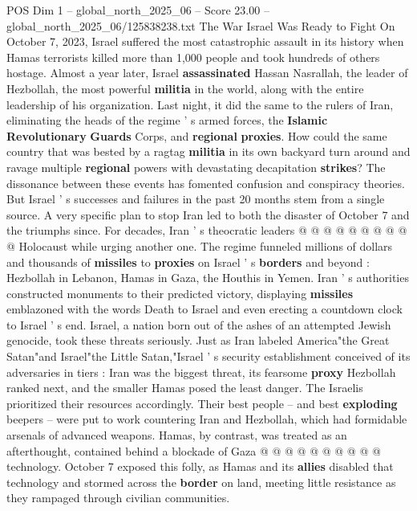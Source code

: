 \begin{textsample}{POS Dim 1 – global\_north\_2025\_06 – Score 23.00 – global\_north\_2025\_06/125838238.txt}  \label{ex:f1_pos_335}
The War Israel Was Ready to Fight On October 7, 2023, Israel suffered the most catastrophic assault in its history when Hamas terrorists killed more than 1,000 people and took hundreds of others hostage.
Almost a year later, Israel \textbf{assassinated} Hassan Nasrallah, the leader of Hezbollah, the most powerful \textbf{militia} in the world, along with the entire leadership of his organization.
Last night, it did the same to the rulers of Iran, eliminating the heads of the regime ' s armed forces, the \textbf{Islamic} \textbf{Revolutionary} \textbf{Guards} Corps, and \textbf{regional} \textbf{proxies}.
How could the same country that was bested by a ragtag \textbf{militia} in its own backyard turn around and ravage multiple \textbf{regional} powers with devastating decapitation \textbf{strikes}?
The dissonance between these events has fomented confusion and conspiracy theories.
But Israel ' s successes and failures in the past 20 months stem from a single source.
A very specific plan to stop Iran led to both the disaster of October 7 and the triumphs since.
For decades, Iran ' s theocratic leaders @ @ @ @ @ @ @ @ @ @ Holocaust while urging another one.
The regime funneled millions of dollars and thousands of \textbf{missiles} to \textbf{proxies} on Israel ' s \textbf{borders} and beyond : Hezbollah in Lebanon, Hamas in Gaza, the Houthis in Yemen.
Iran ' s authorities constructed monuments to their predicted victory, displaying \textbf{missiles} emblazoned with the words Death to Israel and even erecting a countdown clock to Israel ' s end.
Israel, a nation born out of the ashes of an attempted Jewish genocide, took these threats seriously.
Just as Iran labeled America"the Great Satan"and Israel"the Little Satan,"Israel ' s security establishment conceived of its adversaries in tiers : Iran was the biggest threat, its fearsome \textbf{proxy} Hezbollah ranked next, and the smaller Hamas posed the least danger.
The Israelis prioritized their resources accordingly.
Their best people -- and best \textbf{exploding} beepers -- were put to work countering Iran and Hezbollah, which had formidable arsenals of advanced weapons.
Hamas, by contrast, was treated as an afterthought, contained behind a blockade of Gaza @ @ @ @ @ @ @ @ @ @ technology.
October 7 exposed this folly, as Hamas and its \textbf{allies} disabled that technology and stormed across the \textbf{border} on land, meeting little resistance as they rampaged through civilian communities.

\end{textsample}
